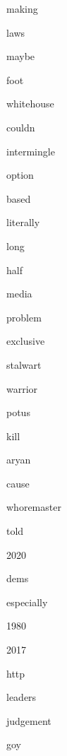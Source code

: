 \documentclass[varwidth]{standalone}
\begin{document}
\begin{CJK*}{UTF8}{gbsn}
{{{\colorbox{red!12.149392127990723}{\strut making}
\colorbox{red!3.572704315185547}{\strut laws}
\colorbox{red!6.452230453491211}{\strut maybe}
\colorbox{red!6.189535140991211}{\strut foot}
\colorbox{red!9.702471733093262}{\strut whitehouse}
\colorbox{red!4.724415302276611}{\strut couldn}
\colorbox{red!11.535627365112305}{\strut intermingle}
\colorbox{red!8.678194046020508}{\strut option}
\colorbox{red!9.195419311523438}{\strut based}
\colorbox{red!3.602452516555786}{\strut literally}
\colorbox{red!5.916396141052246}{\strut long}
\colorbox{red!3.616753101348877}{\strut half}
\colorbox{red!7.22503662109375}{\strut media}
\colorbox{red!5.670478820800781}{\strut problem}
\colorbox{red!3.916797161102295}{\strut exclusive}
\colorbox{red!10.333885192871094}{\strut stalwart}
\colorbox{red!0.40540504455566406}{\strut warrior}
\colorbox{red!7.426604270935059}{\strut potus}
\colorbox{red!8.636405944824219}{\strut kill}
\colorbox{red!10.03671646118164}{\strut aryan}
\colorbox{red!7.6659746170043945}{\strut cause}
\colorbox{red!6.702888488769531}{\strut whoremaster}
\colorbox{red!7.575307846069336}{\strut told}
\colorbox{red!0}{\strut 2020}
\colorbox{red!7.476179122924805}{\strut dems}
\colorbox{red!7.746766090393066}{\strut especially}
\colorbox{red!0.2645549774169922}{\strut 1980}
\colorbox{red!0.1274423599243164}{\strut 2017}
\colorbox{red!1.5822429656982422}{\strut http}
\colorbox{red!2.4117283821105957}{\strut leaders}
\colorbox{red!3.362677812576294}{\strut judgement}
\colorbox{red!11.305170059204102}{\strut goy}

}}}
\end{CJK*}
\end{document}

